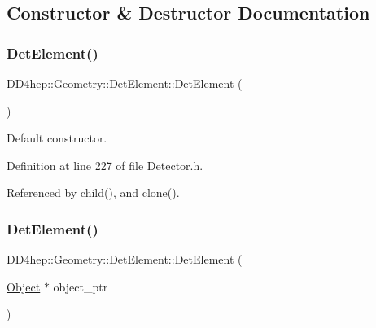 \subsection{Constructor \& Destructor Documentation}
\hypertarget{class_d_d4hep_1_1_geometry_1_1_det_element_a005be4fc3aa34d82ee55af3f9bb78e47}{}\label{class_d_d4hep_1_1_geometry_1_1_det_element_a005be4fc3aa34d82ee55af3f9bb78e47} 
\subsubsection{\texorpdfstring{Det\+Element()}{DetElement()}\hspace{0.1cm}{\footnotesize\ttfamily [1/8]}}
{\footnotesize\ttfamily D\+D4hep\+::\+Geometry\+::\+Det\+Element\+::\+Det\+Element (\begin{DoxyParamCaption}{ }\end{DoxyParamCaption})\hspace{0.3cm}{\ttfamily [inline]}}



Default constructor. 



Definition at line 227 of file Detector.\+h.



Referenced by child(), and clone().

\hypertarget{class_d_d4hep_1_1_geometry_1_1_det_element_a8f0fb6554c6b1589e6e44d879735e269}{}\label{class_d_d4hep_1_1_geometry_1_1_det_element_a8f0fb6554c6b1589e6e44d879735e269} 
\subsubsection{\texorpdfstring{Det\+Element()}{DetElement()}\hspace{0.1cm}{\footnotesize\ttfamily [2/8]}}
{\footnotesize\ttfamily D\+D4hep\+::\+Geometry\+::\+Det\+Element\+::\+Det\+Element (\begin{DoxyParamCaption}\item[{\hyperlink{class_d_d4hep_1_1_geometry_1_1_det_element_a4e44e860d6e5827d9f42a4aea3a4f288}{Object} $\ast$}]{object\+\_\+ptr }\end{DoxyParamCaption})\hspace{0.3cm}{\ttfamily [inline]}}



